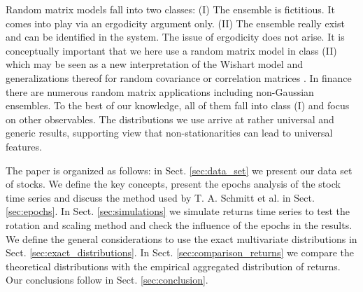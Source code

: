 Random matrix models \cite{random_matrix_1,random_matrix_2} fall into two
classes: (I) The ensemble is fictitious. It comes into play via an ergodicity
argument only. (II) The ensemble really exist and can be identified in the
system. The issue of ergodicity does not arise. It is conceptually important
that we here use a random matrix model in class (II) which may be seen as a new
interpretation of the Wishart model and generalizations thereof for random
covariance or correlation matrices \cite{wishart}. In finance there are
numerous random matrix applications
\cite{matrix_fin_01,matrix_fin_02,matrix_fin_03,matrix_fin_04,matrix_fin_05,matrix_fin_06,matrix_fin_07,matrix_fin_08,matrix_fin_09,matrix_fin_10,matrix_fin_11,matrix_fin_12,matrix_fin_13}
including non-Gaussian ensembles. To the best of our knowledge, all of them
fall into class (I) and focus on other observables. The distributions we use
arrive at rather universal and generic results, supporting view that
non-stationarities can lead to universal features.

The paper is organized as follows: in Sect. \ref{sec:data_set} we present our
data set of stocks. We define the key concepts, present the epochs analysis of
the stock time series and discuss the method used by T. A. Schmitt et al.
\cite{non_stationarity_fin_guhr} in Sect. \ref{sec:epochs}. In Sect.
\ref{sec:simulations} we simulate returns time series to test the rotation and
scaling method and check the influence of the epochs in the results. We define
the general considerations to use the exact multivariate distributions in Sect.
\ref{sec:exact_distributions}. In Sect. \ref{sec:comparison_returns} we compare
the theoretical distributions with the empirical aggregated distribution of
returns. Our conclusions follow in Sect. \ref{sec:conclusion}.